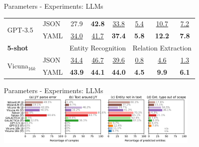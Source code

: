 \documentclass[en,16:9,smallfoot]{sdqbeamer}
\begin{document}
\begin{frame}{Parameters - Experiments: LLMs}
\begin{table}
\begin{small}
\begin{tabular}{ll|ccc|ccc}
        \multirow{2}{*}{GPT-3.5} &
        JSON & 27.9 & \textbf{42.8} & \underline{33.8}
                  & \underline{5.4} & \underline{10.7} & \underline{7.2} \\
        \ & YAML & \underline{34.0} & \underline{41.7} &
        \hphantom{${}_{\Delta\text{+3.6}}$}
        \textbf{37.4}{\color{parametergreen}{${}_{\Delta\text{+3.6}}$}}
                  & \textbf{5.8} & \textbf{12.2} &
        \hphantom{${}_{\Delta\text{+0.6}}$}
        \textbf{7.8}{\color{parametergreen}{${}_{\Delta\text{+0.6}}$}}  \\

      \hline
        \multicolumn{2}{l|}{\textbf{5-shot}} &
        \multicolumn{3}{c|}{Entity Recognition} &
        \multicolumn{3}{c}{Relation Extraction} \\
      \hline

        \multirow{2}{*}{Vicuna${}_{16k}$} &
        JSON & \underline{34.4} & \underline{46.7} & \underline{39.6}
                  & \underline{0.8} & \underline{4.6} & \underline{1.3} \\
        \ & YAML & \textbf{43.9} & \textbf{44.1} &
        \hphantom{${}_{\Delta\text{+0.4}}$}
        \textbf{44.0}{\color{parametergreen}{${}_{\Delta\text{+0.4}}$}}
                  & \textbf{4.5} & \textbf{9.9} &
        \hphantom{${}_{\Delta\text{+4.8}}$}
        \textbf{6.1}{\color{parametergreen}{${}_{\Delta\text{+4.8}}$}}  \\
      \hline
      \end{tabular}
     \end{small}
    \end{table}
   \end{frame}

   \begin{frame}{Parameters - Experiments: LLMs}
       \centering
       \includegraphics[width=0.75\textwidth]{imgs/llm_format_eval_mix}
   \end{frame}
\end{document}

